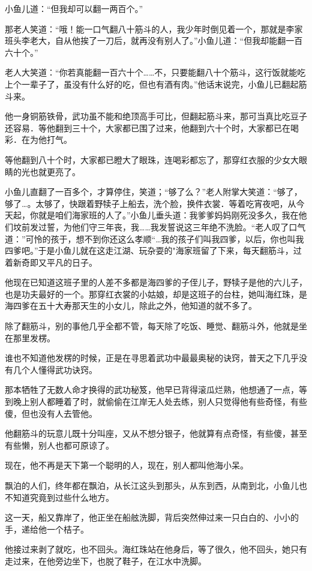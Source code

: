 \documentclass[12pt,oneside]{book}
\begin{document}
小鱼儿道：``但我却可以翻一两百个。''

那老人笑道：``哦！能一口气翻八十筋斗的人，我少年时倒见着一个，那就是李家班头李老大，自从他挨了一刀后，就再没有别人了。''小鱼儿道：``但我却能翻一百六十个。''

老人大笑道：``你若真能翻一百六十个\ldots\ldots 不，只要能翻八十个筋斗，这行饭就能吃上个一辈子了，虽没有什么好的吃，但也有酒有肉。''他话末说完，小鱼儿已翻起筋斗来。

他一身铜筋铁骨，武功虽不能和绝顶高手可比，但翻起筋斗来，那可当真比吃豆子还容易．等他翻到三十个，大家都已围了过来，他翻到六十个时，大家都已在喝彩．在为他打气。

等他翻到八十个时，大家都已瞪大了眼珠，连喝彩都忘了，那穿红衣服的少女大眼睛的光也就更亮了。

小鱼儿直翻了一百多个，才算停住，笑道；``够了么？''老人附掌大笑道：``够了，够了\ldots。太够了，快跟着野犊子上船去，洗个脸，换件衣裳．等着吃宵夜吧，从今天起，你就是咱们海家班的人了。''小鱼儿垂头道：我爹爹妈妈刚死没多久，我在他们坟前发过誓，为他们守三年丧，我\ldots\ldots 我发誓说这三年绝不洗脸。``老人叹了口气道：''可怜的孩于，想不到你还这么孝顺``\ldots 我的孩子们叫我四爹，以后，你也叫我四爹吧。''于是小鱼儿就在这走江湖、玩杂耍的"海家班留了下来，每天翻筋斗，过着新奇即又平凡的日子。

他现在已知道这班子里的人差不多都是海四爹的子侄儿子，野犊子是他的六儿子，也是功夫最好的一个。那穿红衣裳的小姑娘，却是这班子的台柱，她叫海红珠，是海四爹在五十大寿那天生的小女儿，除此之外，他知道的就不多了。

除了翻筋斗，别的事他几乎全都不管，每天除了吃饭、睡觉、翻筋斗外，他就是坐在那里发楞。

谁也不知道他发楞的时候，正是在寻思着武功中最最奥秘的诀窍，普天之下几乎没有几个人懂得武功诀窍。

那本牺牲了无数人命才换得的武功秘笈，他早已背得滚瓜烂熟，他想通了一点，等到晚上别人都睡着了时，就偷偷在江岸无人处去练，别人只觉得他有些奇怪，有些傻，但也没有人去管他。

他翻筋斗的玩意儿既十分叫座，又从不想分银子，他就算有点奇怪，有些傻，甚至有些懒，别人也都可原谅了。

现在，他不再是天下第一个聪明的人，现在，别人都叫他海小呆。

飘泊的人们，终年都在飘泊，从长江这头到那头，从东到西，从南到北，小鱼儿也不知道究竟到过些什么地方。

这一天，船又靠岸了，他正坐在船舷洗脚，背后突然伸过来一只白白的、小小的手，递给他一个桔子。

他接过来剥了就吃，也不回头。海红珠站在他身后，等了很久，他不回头，她只有走过来，在他旁边坐下，也脱了鞋子，在江水中洗脚。
\end{document}
